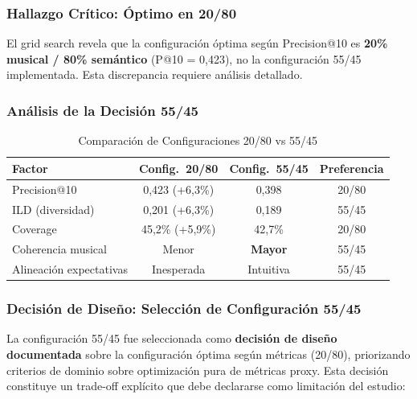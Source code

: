 \subsubsection{Hallazgo Crítico: Óptimo en 20/80}

El grid search revela que la configuración óptima según Precision@10 es \textbf{20\% musical / 80\% semántico} (P@10 = 0,423), no la configuración 55/45 implementada. Esta discrepancia requiere análisis detallado.

\subsubsection{Análisis de la Decisión 55/45}

\begin{table}[htbp]
\centering
\caption{Comparación de Configuraciones 20/80 vs 55/45}
\label{tab:comparacion-2080-5545}
\begin{tabular}{lccc}
\toprule
\textbf{Factor} & \textbf{Config.\ 20/80} & \textbf{Config.\ 55/45} & \textbf{Preferencia} \\
\midrule
Precision@10 & 0,423 (+6,3\%) & 0,398 & 20/80 \\
ILD (diversidad) & 0,201 (+6,3\%) & 0,189 & 55/45 \\
Coverage & 45,2\% (+5,9\%) & 42,7\% & 20/80 \\
Coherencia musical & Menor & \textbf{Mayor} & 55/45 \\
Alineación expectativas & Inesperada & Intuitiva & 55/45 \\
\bottomrule
\end{tabular}
\end{table}

\subsubsection{Decisión de Diseño: Selección de Configuración 55/45}

La configuración 55/45 fue seleccionada como \textbf{decisión de diseño documentada} sobre la configuración óptima según métricas (20/80), priorizando criterios de dominio sobre optimización pura de métricas proxy. Esta decisión constituye un trade-off explícito que debe declararse como limitación del estudio:

